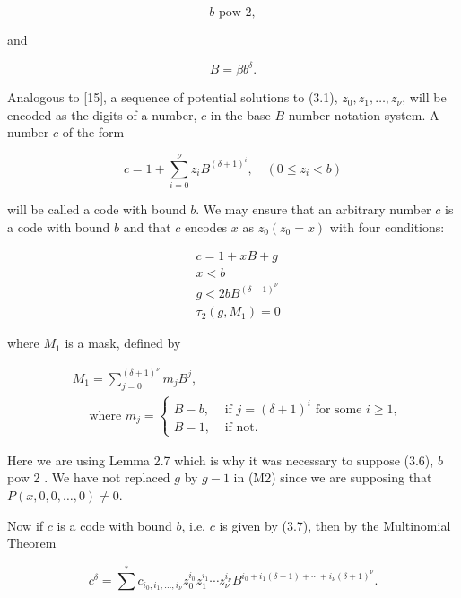 \documentclass[11pt,a4paper]{article}
\begin{document}
\begin{equation*}
b \text { pow } 2, \tag{3.6}
\end{equation*}


and


\begin{equation*}
B=\beta b^{\delta} . \tag{M1}
\end{equation*}


Analogous to [15], a sequence of potential solutions to (3.1), $z_{0},\allowbreak  z_{1},\allowbreak  \ldots,\allowbreak  z_{\nu}$, will be encoded as the digits of a number, $c$ in the base $B$ number notation system. A number $c$ of the form


\begin{equation*}
c=1+\sum_{i=0}^{\nu} z_{i} B^{(\delta+1)^{i}}, \quad\left(0 \leq z_{i}<b\right) \tag{3.7}
\end{equation*}


will be called a code with bound $b$. We may ensure that an arbitrary number $c$ is a code with bound $b$ and that $c$ encodes $x$ as $z_{0}\left(z_{0}=x\right)$ with four conditions:


\begin{align*}
& c=1+x B+g  \tag{M2}\\
& x<b  \tag{M3}\\
& g<2 b B^{(\delta+1)^{\nu}}  \tag{3.8}\\
& \tau_{2}\left(g, M_{1}\right)=0 \tag{3.9}
\end{align*}


where $M_{1}$ is a mask, defined by


\begin{align*}
& M_{1}=\sum_{j=0}^{(\delta+1)^{\nu}} m_{j} B^{j},  \tag{M4}\\
& \quad \text { where } m_{j}= \begin{cases}B-b, & \text { if } j=(\delta+1)^{i} \text { for some } i \geq 1, \\
B-1, & \text { if not. }\end{cases}
\end{align*}


Here we are using Lemma 2.7 which is why it was necessary to suppose (3.6), $b$ pow 2 . We have not replaced $g$ by $g-1$ in (M2) since we are supposing that $P(x,\allowbreak  0,\allowbreak 0,\allowbreak  \ldots,\allowbreak  0) \neq 0$.

Now if $c$ is a code with bound $b$, i.e. $c$ is given by (3.7), then by the Multinomial Theorem


\begin{equation*}
c^{\delta}=\sum^{*} c_{i_{0}, i_{1}, \ldots, i_{\nu}} z_{0}^{i_{0}} z_{1}^{i_{1}} \cdots z_{\nu}^{i_{\nu}} B^{i_{0}+i_{1}(\delta+1)+\cdots+i_{\nu}(\delta+1)^{\nu}} . \tag{3.10}
\end{equation*}
\end{document}
